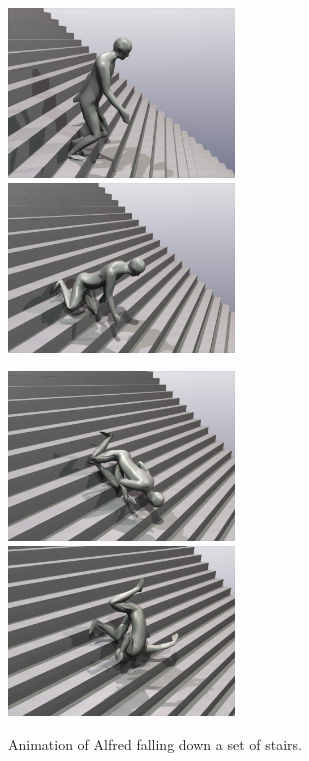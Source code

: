 \begin{figure}[p]
\centerline{\includegraphics[width=60mm,height=45mm]{figures/stairs1} \hspace{5mm}
            \includegraphics[width=60mm,height=45mm]{figures/stairs2}}\vspace{5mm}
\centerline{\includegraphics[width=60mm,height=45mm]{figures/stairs3} \hspace{5mm}
            \includegraphics[width=60mm,height=45mm]{figures/stairs4}}
\caption{Animation of Alfred falling down a set of stairs.\label{sampleStairs}}
\end{figure}

